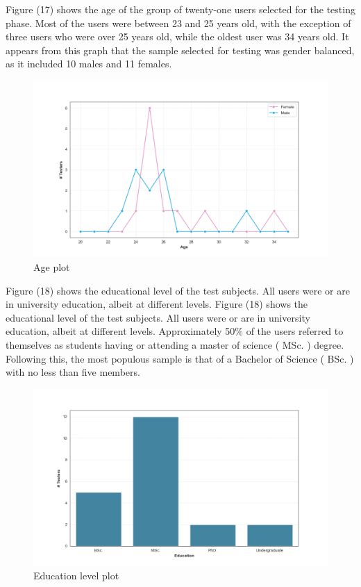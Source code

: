 \newpage

Figure (17) shows the age of the group of twenty-one users selected for the testing phase. 
Most of the users were between 23 and 25 years old, with the exception of three users who were over 25 years old, while the oldest user was 34 years old. 
It appears from this graph that the sample selected for testing was gender balanced, as it included 10 males and 11 females. 
  
\begin{figure}[htp!]
    \centering
    \includegraphics[scale=0.35]{Resources/Shared/agePlot.png}
    \caption{Age plot}
\end{figure}

Figure (18) shows the educational level of the test subjects. 
All users were or are in university education, albeit at different levels. 
Figure (18) shows the educational level of the test subjects. 
All users were or are in university education, albeit at different levels. 
Approximately 50\% of the users referred to themselves as students having or attending a master of science ( MSc. ) degree.
Following this, the most populous sample is that of a Bachelor of Science ( BSc. ) with no less than five members. 

\begin{figure}[htp!]
    \centering
    \includegraphics[scale=0.30]{Resources/Shared/educationPlot.png}
    \caption{Education level plot}
\end{figure}

